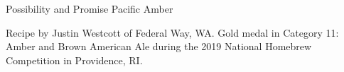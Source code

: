 \begin{recipe}{Possibility and Promise Pacific Amber}

\begin{aboutblock}
Recipe by Justin Westcott of Federal Way, WA. Gold medal in Category
11: Amber and Brown American Ale during the 2019 National Homebrew
Competition in Providence, RI. \sourceaha
\end{aboutblock}


\begin{methodandtiming}
 
\begin{mashsteps}
\end{mashsteps}

\begin{fermentationsteps}
\end{fermentationsteps}

\end{methodandtiming}

\recipebreak

\begin{ingredientsblock}

\begin{malts}
\end{malts}

\begin{hops}
\end{hops}


\end{ingredientsblock}

\end{recipe}
